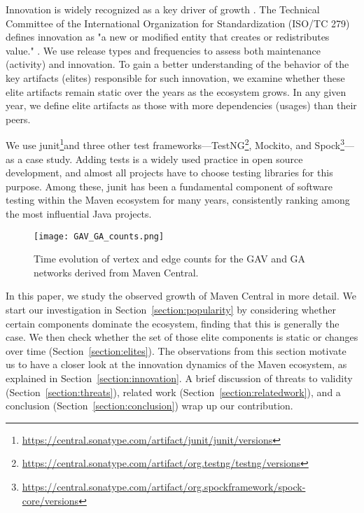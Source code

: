 \documentclass[10pt,conference]{IEEEtran}
\begin{document}
Innovation is widely recognized as a key driver of growth \cite{mazzucato2015innovation, nicolaides2014research, ronkko2013innovation}. The Technical Committee of the International Organization for Standardization (ISO/TC 279) defines innovation as "a new or modified entity that creates or redistributes value." \cite{ISO56000:2025}. We use release types and frequencies to assess both maintenance (activity) and innovation. To gain a better understanding of the behavior of the key artifacts (elites) responsible for such innovation, we examine whether these elite artifacts remain static over the years as the ecosystem grows. In any given year, we define elite artifacts as those with more dependencies (usages) than their peers.

We use junit\footnote{\url{https://central.sonatype.com/artifact/junit/junit/versions}}and three other test frameworks—TestNG\footnote{\url{https://central.sonatype.com/artifact/org.testng/testng/versions}}, Mockito, and Spock\footnote{\url{https://central.sonatype.com/artifact/org.spockframework/spock-core/versions}}—as a case study. Adding tests is a widely used practice in open source development, and almost all projects have to choose testing libraries for this purpose. Among these, junit has been a fundamental component of software testing within the Maven ecosystem for many years, consistently ranking among the most influential Java projects.

\begin{figure}[t]
\centering
\texttt{[image: GAV\_GA\_counts.png]}
\caption{Time evolution of vertex and edge counts for the GAV
and GA networks derived from Maven Central.}
\label{fig:counts}
\end{figure}

In this paper, we study the observed growth of Maven Central in more detail. 
We start our investigation in Section~\ref{section:popularity} by
considering whether certain components dominate the ecosystem,
finding that this is generally the case. We then check whether
the set of those elite components is static or changes over time (Section~\ref{section:elites}). The observations from this
section motivate us to have a closer look at the innovation
dynamics of the Maven ecosystem, as explained in
Section~\ref{section:innovation}. A brief discussion of threats to validity (Section~\ref{section:threats}), related
work (Section~\ref{section:relatedwork}), and a conclusion
(Section~\ref{section:conclusion}) wrap up our contribution. 
\end{document}
